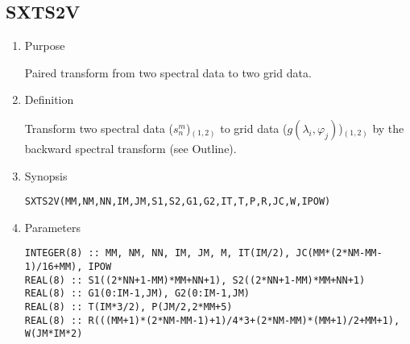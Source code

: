 \documentclass[a4paper]{scrartcl}
\begin{document}

\subsection{SXTS2V}

\begin{enumerate}

\item Purpose

Paired transform from two spectral data to two grid data.
  
\item Definition

Transform two spectral data ($s^m_n$)$_{(1,2)}$ 
to grid data ($g(\lambda_i,\varphi_j)$)$_{(1,2)}$ 
by the backward spectral transform (see Outline).

\item Synopsis 

\texttt{SXTS2V(MM,NM,NN,IM,JM,S1,S2,G1,G2,IT,T,P,R,JC,W,IPOW)}
  
\item Parameters

\begin{verbatim}        
INTEGER(8) :: MM, NM, NN, IM, JM, M, IT(IM/2), JC(MM*(2*NM-MM-1)/16+MM), IPOW
REAL(8) :: S1((2*NN+1-MM)*MM+NN+1), S2((2*NN+1-MM)*MM+NN+1)
REAL(8) :: G1(0:IM-1,JM), G2(0:IM-1,JM)
REAL(8) :: T(IM*3/2), P(JM/2,2*MM+5)
REAL(8) :: R(((MM+1)*(2*NM-MM-1)+1)/4*3+(2*NM-MM)*(MM+1)/2+MM+1), W(JM*IM*2)
\end{verbatim}      


\end{enumerate}
\end{document}
